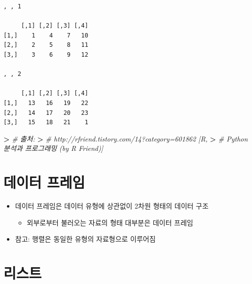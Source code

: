 \documentclass[12pt,a4paper]{book}
\newenvironment{Shaded}{\begin{snugshade}}{\end{snugshade}}
\newcommand{\StringTok}[1]{\textcolor[rgb]{0.31,0.60,0.02}{#1}}
\newcommand{\CommentTok}[1]{\textcolor[rgb]{0.56,0.35,0.01}{\textit{#1}}}
\newcommand{\OperatorTok}[1]{\textcolor[rgb]{0.81,0.36,0.00}{\textbf{#1}}}
\newcommand{\ErrorTok}[1]{\textcolor[rgb]{0.64,0.00,0.00}{\textbf{#1}}}
\providecommand{\tightlist}{%
  \setlength{\itemsep}{0pt}\setlength{\parskip}{0pt}}
\theoremstyle{definition}
\theoremstyle{definition}
\theoremstyle{definition}
\theoremstyle{remark}
\begin{document}
\begin{verbatim}
, , 1

     [,1] [,2] [,3] [,4]
[1,]    1    4    7   10
[2,]    2    5    8   11
[3,]    3    6    9   12

, , 2

     [,1] [,2] [,3] [,4]
[1,]   13   16   19   22
[2,]   14   17   20   23
[3,]   15   18   21    1
\end{verbatim}

\begin{Shaded}
\begin{Highlighting}[]
\OperatorTok{>}\StringTok{ }\CommentTok{# 출처:}
\ErrorTok{>}\StringTok{ }\CommentTok{# http://rfriend.tistory.com/14?category=601862 [R,}
\ErrorTok{>}\StringTok{ }\CommentTok{# Python 분석과 프로그래밍 (by R Friend)]}
\end{Highlighting}
\end{Shaded}

\section{데이터 프레임}\label{-}

\begin{itemize}
\tightlist
\item
  데이터 프레임은 데이터 유형에 상관없이 2차원 형태의 데이터 구조

  \begin{itemize}
  \tightlist
  \item
    외부로부터 불러오는 자료의 형태 대부분은 데이터 프레임
  \end{itemize}
\item
  참고: 행렬은 동일한 유형의 자료형으로 이루어짐
\end{itemize}

\section{리스트}
\end{document}
